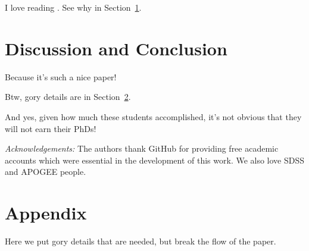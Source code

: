\documentclass[12pt,preprint]{aastex}
\newcommand{\Sect}[1]{Section~\ref{sect:#1}}
\newcommand{\sect}[1]{\Sect{#1}}
\newcommand{\sectlabel}[1]{\label{sect:#1}}
\begin{document}
I love reading \citet{Ivezic08LSST}. See why in \sect{discussion}.



\section{Discussion and Conclusion}
\sectlabel{discussion}

Because it's such a nice paper! 

Btw, gory details are in \sect{otherstuff}. 

And yes, given how much these students accomplished, it's not obvious that 
they will not earn their PhDs! 

{\it Acknowledgements:} The authors thank GitHub for providing free academic accounts which were essential 
in the development of this work. We also love SDSS and APOGEE people. 






\appendix
\section{Appendix}
\sectlabel{otherstuff}

Here we put gory details that are needed, but break the flow of the paper. 
\end{document}
